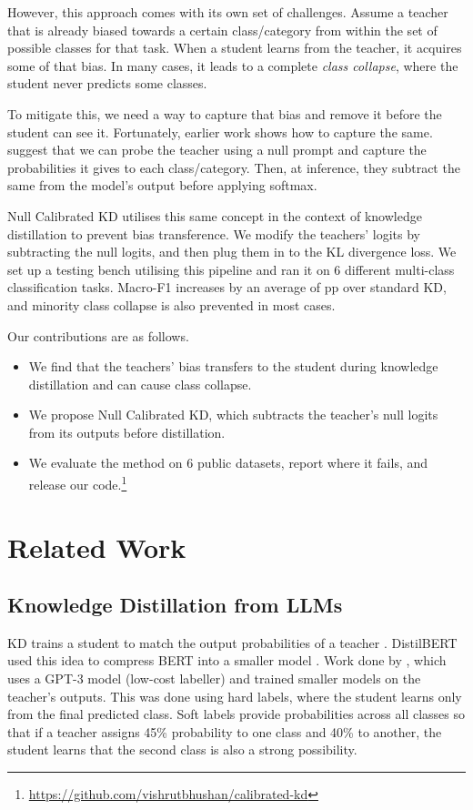\documentclass[11pt]{article}
\begin{document}
However, this approach comes with its own set of challenges.
Assume a teacher that is already biased towards a certain class/category from within the set of possible classes for that task.
When a student learns from the teacher, it acquires some of that bias.
In many cases, it leads to a complete \emph{class collapse}, where the student never predicts some classes.

To mitigate this, we need a way to capture that bias and remove it before the student can see it.
Fortunately, earlier work shows how to capture the same.
\citet{zhao2021calibrate} suggest that we can probe the teacher using a null prompt and capture the probabilities it gives to each class/category.
Then, at inference, they subtract the same from the model's output before applying softmax.

Null Calibrated KD utilises this same concept in the context of knowledge distillation to prevent bias transference.
We modify the teachers' logits by subtracting the null logits, and then plug them in to the KL divergence loss.
We set up a testing bench utilising this pipeline and ran it on 6 different multi-class classification tasks.
Macro-F1 increases by an average of \AvgGainStd{} pp over standard KD, and minority class collapse is also prevented in most cases.

Our contributions are as follows.
\begin{itemize}
    \item We find that the teachers' bias transfers to the student during knowledge distillation and can cause class collapse.
    \item We propose Null Calibrated KD, which subtracts the teacher's null logits from its outputs before distillation.
    \item We evaluate the method on 6 public datasets, report where it fails, and release our code.\footnote{\url{https://github.com/vishrutbhushan/calibrated-kd}}
\end{itemize}

\section{Related Work}

\subsection{Knowledge Distillation from LLMs}

KD trains a student to match the output probabilities of a teacher \citep{hinton2015distilling}.
DistilBERT used this idea to compress BERT into a smaller model \citep{sanh2019distilbert}.
Work done by \citet{wang2021want} , which uses a GPT-3 model (low-cost labeller) and trained smaller models on the teacher's outputs.
This was done using hard labels, where the student learns only from the final predicted class.
Soft labels provide probabilities across all classes so that if a teacher assigns 45\% probability to one class and 40\% to another, the student learns that the second class is also a strong possibility.
\end{document}
